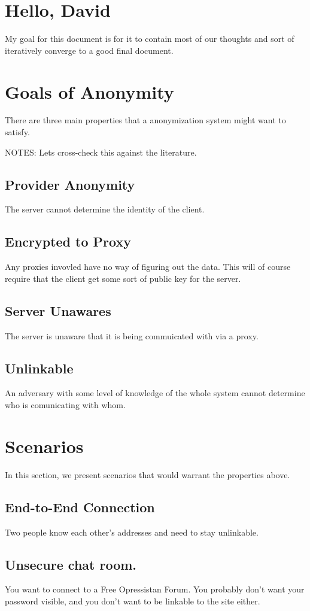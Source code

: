 \documentclass{article}
\begin{document}
\section{Hello, David}
My goal for this document is for it to contain most of our thoughts and sort of iteratively converge to a good final document.
\section{Goals of Anonymity}
There are three main properties that a anonymization system might want to satisfy.

NOTES: Lets cross-check this against the literature.
\subsection{Provider Anonymity}
The server cannot determine the identity of the client.
\subsection{Encrypted to Proxy}
Any proxies invovled have no way of figuring out the data.  This will of course require that the client get some sort of public key for the server.
\subsection{Server Unawares}
The server is unaware that it is being commuicated with via a proxy.
\subsection{Unlinkable}
An adversary with some level of knowledge of the whole system cannot determine who is comunicating with whom.
\section{Scenarios}
In this section, we present scenarios that would warrant the properties above.
\subsection{End-to-End Connection}
Two people know each other's addresses and need to stay unlinkable.
\subsection{Unsecure chat room.}
You want to connect to a Free Opressistan Forum.  You probably don't want your password visible, and you don't want to be linkable to the site either.
\end{document}
